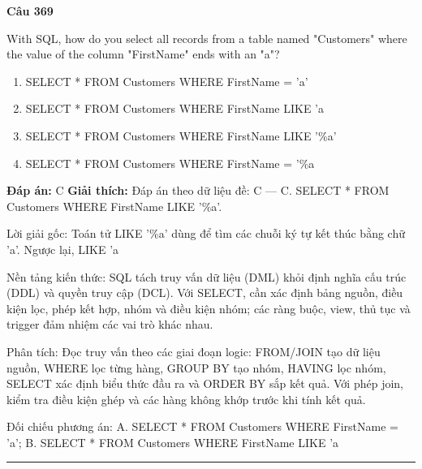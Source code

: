 \documentclass[11pt,a4paper]{article}
\newenvironment{question}[1]{%
  \par\vspace{1em}\noindent\textbf{\large Câu #1}\par\vspace{0.4em}
}{%
  \par\vspace{1em}\hrule\vspace{0.6em}
}
\newenvironment{choices}{%
  \begin{enumerate}[label=\textbf{\Alph*.},leftmargin=2.2em,itemsep=2pt,topsep=3pt]
}{%
  \end{enumerate}
}
\newcommand{\choice}{\item}
\begin{document}
\begin{question}{369}
With SQL, how do you select all records from a table named "Customers" where the value of the column "FirstName" ends with an "a"?
\begin{choices}
\choice SELECT * FROM Customers WHERE FirstName = 'a'
\choice SELECT * FROM Customers WHERE FirstName LIKE 'a%
\choice SELECT * FROM Customers WHERE FirstName LIKE '\%a'
\choice SELECT * FROM Customers WHERE FirstName = '\%a%
\end{choices}
\textbf{Đáp án:} C
\textbf{Giải thích:} Đáp án theo dữ liệu đề: C — C. SELECT * FROM Customers WHERE FirstName LIKE '\%a'.

Lời giải gốc: Toán tử LIKE '\%a' dùng để tìm các chuỗi ký tự kết thúc bằng chữ 'a'. Ngược lại, LIKE 'a%

Nền tảng kiến thức: SQL tách truy vấn dữ liệu (DML) khỏi định nghĩa cấu trúc (DDL) và quyền truy cập (DCL). Với SELECT, cần xác định bảng nguồn, điều kiện lọc, phép kết hợp, nhóm và điều kiện nhóm; các ràng buộc, view, thủ tục và trigger đảm nhiệm các vai trò khác nhau.

Phân tích: Đọc truy vấn theo các giai đoạn logic: FROM/JOIN tạo dữ liệu nguồn, WHERE lọc từng hàng, GROUP BY tạo nhóm, HAVING lọc nhóm, SELECT xác định biểu thức đầu ra và ORDER BY sắp kết quả. Với phép join, kiểm tra điều kiện ghép và các hàng không khớp trước khi tính kết quả.

Đối chiếu phương án: A. SELECT * FROM Customers WHERE FirstName = 'a'; B. SELECT * FROM Customers WHERE FirstName LIKE 'a%
\end{question}
\end{document}
